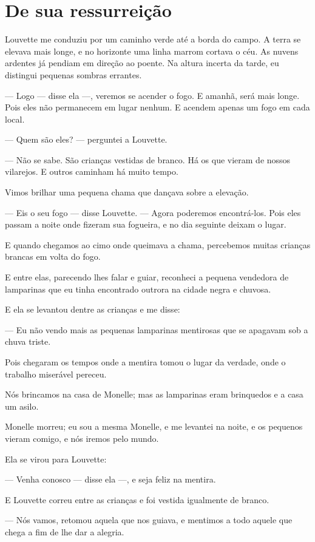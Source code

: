 \section*{De sua ressurreição}

Louvette me conduziu por um caminho verde até a borda do campo. A terra
se elevava mais longe, e no horizonte uma linha marrom cortava o céu. As
nuvens ardentes já pendiam em direção ao poente. Na altura incerta da
tarde, eu distingui pequenas sombras errantes.

--- Logo --- disse ela ---, veremos se acender o fogo. E amanhã, será mais
longe. Pois eles não permanecem em lugar nenhum. E acendem apenas um
fogo em cada local.

--- Quem são eles? --- perguntei a Louvette.

--- Não se sabe. São crianças vestidas de branco. Há os que vieram de
nossos vilarejos. E outros caminham há muito tempo.

Vimos brilhar uma pequena chama que dançava sobre a elevação.

--- Eis o seu fogo --- disse Louvette. --- Agora poderemos encontrá-los. Pois
eles passam a noite onde fizeram sua fogueira, e no dia seguinte deixam o
lugar.

E quando chegamos ao cimo onde queimava a chama, percebemos muitas
crianças brancas em volta do fogo.

E entre elas, parecendo lhes falar e guiar, reconheci a pequena
vendedora de lamparinas que eu tinha encontrado outrora na cidade negra e
chuvosa.

E ela se levantou dentre as crianças e me disse:

--- Eu não vendo mais as pequenas lamparinas mentirosas que se apagavam
sob a chuva triste.

Pois chegaram os tempos onde a mentira tomou o lugar da verdade, onde o
trabalho miserável pereceu.

Nós brincamos na casa de Monelle; mas as lamparinas eram brinquedos e a
casa um asilo.

Monelle morreu; eu sou a mesma Monelle, e me levantei na noite, e os
pequenos vieram comigo, e nós iremos pelo mundo.

Ela se virou para Louvette:

--- Venha conosco --- disse ela ---, e seja feliz na mentira.

E Louvette correu entre as crianças e foi vestida igualmente de branco.

--- Nós vamos, retomou aquela que nos guiava, e mentimos a todo aquele
que chega a fim de lhe dar a alegria.

